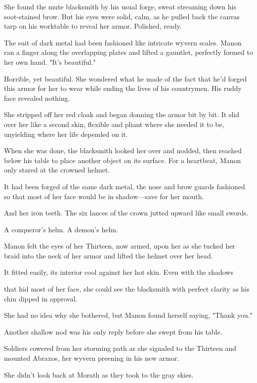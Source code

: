 She found the mute blacksmith by his usual forge, sweat streaming down his soot-stained brow. But his eyes were solid, calm, as he pulled back the canvas tarp on his worktable to reveal her armor. Polished, ready.

The suit of dark metal had been fashioned like intricate wyvern scales. Manon ran a finger along the overlapping plates and lifted a gauntlet, perfectly formed to her own hand. "It's beautiful."

Horrible, yet beautiful. She wondered what he made of the fact that he'd forged this armor for her to wear while ending the lives of his countrymen. His ruddy face revealed nothing.

She stripped off her red cloak and began donning the armor bit by bit. It slid over her like a second skin, flexible and pliant where she needed it to be, unyielding where her life depended on it.

When she was done, the blacksmith looked her over and nodded, then reached below his table to place another object on its surface. For a heartbeat, Manon only stared at the crowned helmet.

It had been forged of the same dark metal, the nose and brow guards fashioned so that most of her face would be in shadow---save for her mouth.

And her iron teeth. The six lances of the crown jutted upward like small swords.

A conqueror's helm. A demon's helm.

Manon felt the eyes of her Thirteen, now armed, upon her as she tucked her braid into the neck of her armor and lifted the helmet over her head.

It fitted easily, its interior cool against her hot skin. Even with the shadows

that hid most of her face, she could see the blacksmith with perfect clarity as his chin dipped in approval.

She had no idea why she bothered, but Manon found herself saying, "Thank you."

Another shallow nod was his only reply before she swept from his table.

Soldiers cowered from her storming path as she signaled to the Thirteen and mounted Abraxos, her wyvern preening in his new armor.

She didn't look back at Morath as they took to the gray skies.

